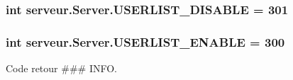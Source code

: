 \subsubsection[{U\+S\+E\+R\+L\+I\+S\+T\+\_\+\+D\+I\+S\+A\+B\+L\+E}]{\setlength{\rightskip}{0pt plus 5cm}int serveur.\+Server.\+U\+S\+E\+R\+L\+I\+S\+T\+\_\+\+D\+I\+S\+A\+B\+L\+E = 301}\label{namespaceserveur_1_1_server_a90e5e028b94e11e73745c0830ea48dd6}
\hypertarget{namespaceserveur_1_1_server_a4712f809a0369863821f1f3611b0c6a9}{}
\subsubsection[{U\+S\+E\+R\+L\+I\+S\+T\+\_\+\+E\+N\+A\+B\+L\+E}]{\setlength{\rightskip}{0pt plus 5cm}int serveur.\+Server.\+U\+S\+E\+R\+L\+I\+S\+T\+\_\+\+E\+N\+A\+B\+L\+E = 300}\label{namespaceserveur_1_1_server_a4712f809a0369863821f1f3611b0c6a9}


Code retour \#\#\# I\+N\+F\+O. 

